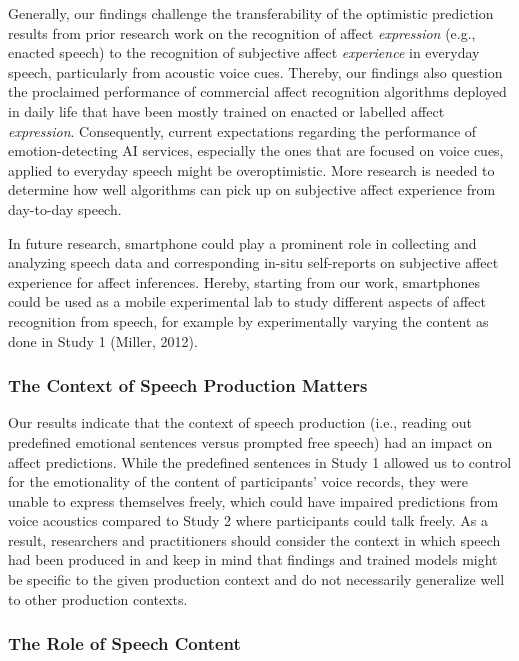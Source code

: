 \documentclass[
  man,floatsintext]{apa6}
\begin{document}
Generally, our findings challenge the transferability of the optimistic prediction results from prior research work on the recognition of affect \emph{expression} (e.g., enacted speech) to the recognition of subjective affect \emph{experience} in everyday speech, particularly from acoustic voice cues. Thereby, our findings also question the proclaimed performance of commercial affect recognition algorithms deployed in daily life that have been mostly trained on enacted or labelled affect \emph{expression}. Consequently, current expectations regarding the performance of emotion-detecting AI services, especially the ones that are focused on voice cues, applied to everyday speech might be overoptimistic. More research is needed to determine how well algorithms can pick up on subjective affect experience from day-to-day speech.

In future research, smartphone could play a prominent role in collecting and analyzing speech data and corresponding in-situ self-reports on subjective affect experience for affect inferences. Hereby, starting from our work, smartphones could be used as a mobile experimental lab to study different aspects of affect recognition from speech, for example by experimentally varying the content as done in Study 1 (Miller, 2012).

\hypertarget{the-context-of-speech-production-matters}{%
\subsubsection{The Context of Speech Production Matters}\label{the-context-of-speech-production-matters}}

Our results indicate that the context of speech production (i.e., reading out predefined emotional sentences versus prompted free speech) had an impact on affect predictions. While the predefined sentences in Study 1 allowed us to control for the emotionality of the content of participants' voice records, they were unable to express themselves freely, which could have impaired predictions from voice acoustics compared to Study 2 where participants could talk freely. As a result, researchers and practitioners should consider the context in which speech had been produced in and keep in mind that findings and trained models might be specific to the given production context and do not necessarily generalize well to other production contexts.

\hypertarget{the-role-of-speech-content}{%
\subsubsection{The Role of Speech Content}\label{the-role-of-speech-content}}
\end{document}
